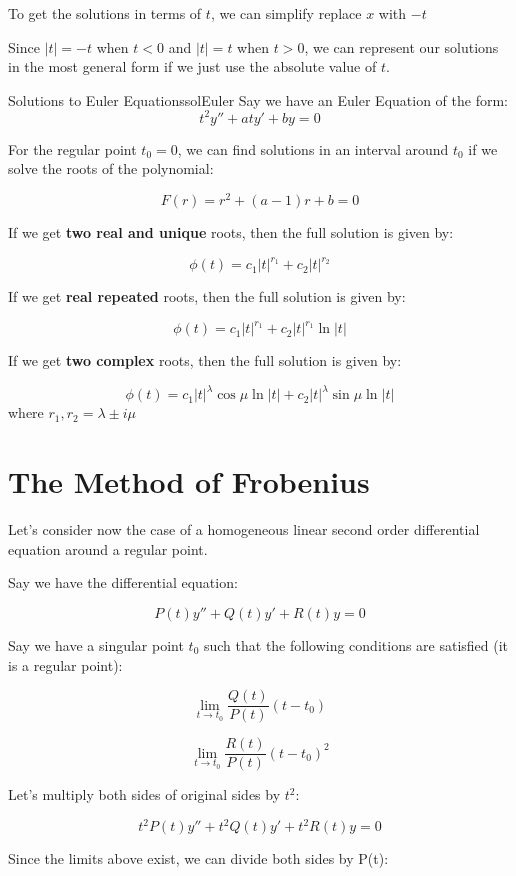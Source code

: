 \documentclass{report}
\begin{document}
{To get the solutions in terms of $t$, we can simplify replace $x$ with $-t$

Since $|t| = -t$ when $t < 0$ and $|t| = t$ when $t>0$, we can represent our solutions in the most general form if we just use the absolute value of $t$.

\begin{mytheo}{Solutions to Euler Equations}{solEuler}
    Say we have an Euler Equation of the form:
    $$t^2y'' + aty' + by = 0$$
    
    For the regular point $t_0 = 0$, we can find solutions in an interval around $t_0$ if we solve the roots of the polynomial:
    
    $$F(r) = r^2 + (a-1)r + b = 0$$
    
    If we get \textbf{two real and unique} roots, then the full solution is given by:
    
    $$\phi(t) = c_1|t|^{r_1} + c_2|t|^{r_2}$$
    
    If we get \textbf{real repeated} roots, then the full solution is given by:

    $$\phi(t) = c_1|t|^{r_1} + c_2|t|^{r_1}\ln{|t|}$$
    
    If we get \textbf{two complex} roots, then the full solution is given by:
    
    $$\phi(t) = c_1|t|^\lambda \cos{\mu \ln |t|} + c_2|t|^\lambda \sin{\mu \ln |t|}$$
    where $r_1, r_2 = \lambda \pm i\mu$
\end{mytheo}


\section{The Method of Frobenius}
Let's consider now the case of a homogeneous linear second order differential equation around a regular point.

Say we have the differential equation:

$$P(t)y'' + Q(t)y' + R(t)y = 0$$

Say we have a singular point $t_0$ such that the following conditions are satisfied (it is a regular point):

$$\lim_{t \to t_0}\frac{Q(t)}{P(t)}(t-t_0)$$

$$\lim_{t \to t_0}\frac{R(t)}{P(t)}(t-t_0)^2$$


Let's multiply both sides of original sides by $t^2$:

$$t^2P(t)y'' + t^2Q(t)y' + t^2R(t)y = 0$$

Since the limits above exist, we can divide both sides by P(t):

}
\end{document}
